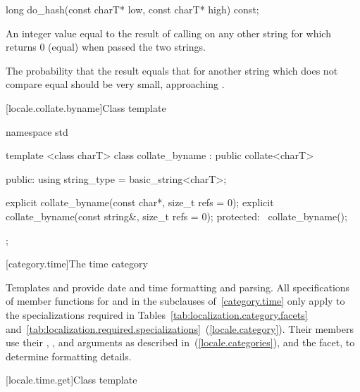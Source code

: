 %
%
\begin{itemdecl}
long do_hash(const charT* low, const charT* high) const;
\end{itemdecl}

\begin{itemdescr}
\pnum
\returns
An integer value equal to the result of calling
on any other string for which
returns 0 (equal) when passed the two strings.
\begin{note}
The probability that the result equals that for another string which does
not compare equal should be very small, approaching
.
\end{note}
\end{itemdescr}

[locale.collate.byname]{Class template }

%
\begin{codeblock}
namespace std {
  template <class charT>
  class collate_byname : public collate<charT> {
  public:
    using string_type = basic_string<charT>;

    explicit collate_byname(const char*, size_t refs = 0);
    explicit collate_byname(const string&, size_t refs = 0);
  protected:
    ~collate_byname();
  };
}
\end{codeblock}

[category.time]{The time category}

\pnum
Templates
and
provide date and time formatting and parsing.
All specifications of member functions for
and
in the subclauses of~\ref{category.time} only apply to the
specializations required in Tables~\ref{tab:localization.category.facets}
and~\ref{tab:localization.required.specializations}~(\ref{locale.category}).
Their members use their
,
,
and
arguments as described in~(\ref{locale.categories}), and the
facet, to determine formatting details.

[locale.time.get]{Class template }

